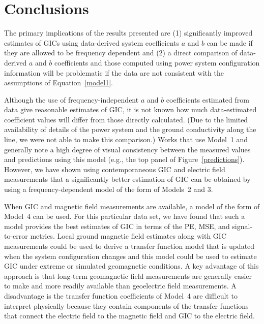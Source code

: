 \documentclass[draft,linenumbers]{agujournal2018}
\begin{document}
 
\section{Conclusions}

The primary implications of the results presented are (1) significantly improved estimates of GICs using data-derived system coefficients $a$ and $b$ can be made if they are allowed to be frequency dependent and (2) a direct comparison of data-derived $a$ and $b$ coefficients and those computed using power system configuration information will be problematic if the data are not consistent with the assumptions of Equation~\ref{model1}.

Although the use of frequency-independent $a$ and $b$ coefficients estimated from data give reasonable estimates of GIC, it is not known how much data-estimated coefficient values will differ from those directly calculated. (Due to the limited availability of details of the power system and the ground conductivity along the line, we were not able to make this comparison.) Works that use Model~1 and generally note a high degree of visual consistency between the measured values and predictions using this model (e.g., the top panel of Figure~\ref{predictions}). However, we have shown using contemporaneous GIC and electric field measurements that a significantly better estimation of GIC can be obtained by using a frequency-dependent model of the form of Models~2 and 3.


When GIC and magnetic field measurements are available, a model of the form of Model~4 can be used. For this particular data set, we have found that such a model provides the best estimates of GIC in terms of the PE, MSE, and signal-to-error metrics. Local ground magnetic field estimates along with GIC measurements could be used to derive a transfer function model that is updated when the system configuration changes and this model could be used to estimate GIC under extreme or simulated geomagnetic conditions. A key advantage of this approach is that long-term geomagnetic field measurements are generally easier to make and more readily available than geoelectric field measurements. A disadvantage is the transfer function coefficients of Model~4 are difficult to interpret physically because they contain components of the transfer functions that connect the electric field to the magnetic field and GIC to the electric field.
\end{document}
